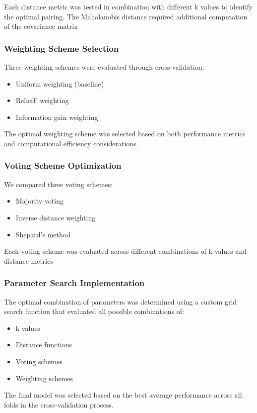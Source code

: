 Each distance metric was tested in combination with different k values to identify the optimal pairing.
The Mahalanobis distance required additional computation of the covariance matrix

\subsubsection*{Weighting Scheme Selection}
Three weighting schemes were evaluated through cross-validation:
\begin{itemize}
\item Uniform weighting (baseline)
\item ReliefF weighting
\item Information gain weighting
\end{itemize}

The optimal weighting scheme was selected based on both performance metrics and computational efficiency considerations.

\subsubsection*{Voting Scheme Optimization}
We compared three voting schemes:
\begin{itemize}
\item Majority voting
\item Inverse distance weighting
\item Shepard's method
\end{itemize}

Each voting scheme was evaluated across different combinations of k values and distance metrics

\subsubsection*{Parameter Search Implementation}
The optimal combination of parameters was determined using a custom grid search function that evaluated all possible combinations of:
\begin{itemize}
    \item k values
    \item Distance functions
    \item Voting schemes
    \item Weighting schemes
\end{itemize}

The final model was selected based on the best average performance across all folds in the cross-validation process.

